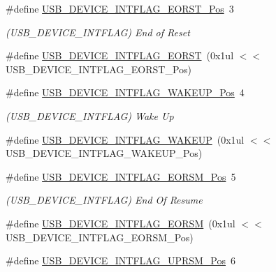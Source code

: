 \begin{DoxyCompactItemize}
\item 
\#define \mbox{\hyperlink{group___s_a_m_d21___u_s_b_ga614893cb9dc255b2b4eef60e35631b44}{U\+S\+B\+\_\+\+D\+E\+V\+I\+C\+E\+\_\+\+I\+N\+T\+F\+L\+A\+G\+\_\+\+E\+O\+R\+S\+T\+\_\+\+Pos}}~3
\begin{DoxyCompactList}\small\item\em (U\+S\+B\+\_\+\+D\+E\+V\+I\+C\+E\+\_\+\+I\+N\+T\+F\+L\+AG) End of Reset \end{DoxyCompactList}\item 
\#define \mbox{\hyperlink{group___s_a_m_d21___u_s_b_ga52b56e82234b7942012de0b2862a6246}{U\+S\+B\+\_\+\+D\+E\+V\+I\+C\+E\+\_\+\+I\+N\+T\+F\+L\+A\+G\+\_\+\+E\+O\+R\+ST}}~(0x1ul $<$$<$ U\+S\+B\+\_\+\+D\+E\+V\+I\+C\+E\+\_\+\+I\+N\+T\+F\+L\+A\+G\+\_\+\+E\+O\+R\+S\+T\+\_\+\+Pos)
\item 
\#define \mbox{\hyperlink{group___s_a_m_d21___u_s_b_ga2c68ce7aca5afcc9b55044c60765980c}{U\+S\+B\+\_\+\+D\+E\+V\+I\+C\+E\+\_\+\+I\+N\+T\+F\+L\+A\+G\+\_\+\+W\+A\+K\+E\+U\+P\+\_\+\+Pos}}~4
\begin{DoxyCompactList}\small\item\em (U\+S\+B\+\_\+\+D\+E\+V\+I\+C\+E\+\_\+\+I\+N\+T\+F\+L\+AG) Wake Up \end{DoxyCompactList}\item 
\#define \mbox{\hyperlink{group___s_a_m_d21___u_s_b_gab02c164bacb2384a8696dcac216bbb4f}{U\+S\+B\+\_\+\+D\+E\+V\+I\+C\+E\+\_\+\+I\+N\+T\+F\+L\+A\+G\+\_\+\+W\+A\+K\+E\+UP}}~(0x1ul $<$$<$ U\+S\+B\+\_\+\+D\+E\+V\+I\+C\+E\+\_\+\+I\+N\+T\+F\+L\+A\+G\+\_\+\+W\+A\+K\+E\+U\+P\+\_\+\+Pos)
\item 
\#define \mbox{\hyperlink{group___s_a_m_d21___u_s_b_gad9f17dc8d2b19fb440eb764f91e7b88e}{U\+S\+B\+\_\+\+D\+E\+V\+I\+C\+E\+\_\+\+I\+N\+T\+F\+L\+A\+G\+\_\+\+E\+O\+R\+S\+M\+\_\+\+Pos}}~5
\begin{DoxyCompactList}\small\item\em (U\+S\+B\+\_\+\+D\+E\+V\+I\+C\+E\+\_\+\+I\+N\+T\+F\+L\+AG) End Of Resume \end{DoxyCompactList}\item 
\#define \mbox{\hyperlink{group___s_a_m_d21___u_s_b_ga6a7810bc403594435eae77f134c424e3}{U\+S\+B\+\_\+\+D\+E\+V\+I\+C\+E\+\_\+\+I\+N\+T\+F\+L\+A\+G\+\_\+\+E\+O\+R\+SM}}~(0x1ul $<$$<$ U\+S\+B\+\_\+\+D\+E\+V\+I\+C\+E\+\_\+\+I\+N\+T\+F\+L\+A\+G\+\_\+\+E\+O\+R\+S\+M\+\_\+\+Pos)
\item 
\#define \mbox{\hyperlink{group___s_a_m_d21___u_s_b_gabd5404f0e8add7199c577eee270d61ed}{U\+S\+B\+\_\+\+D\+E\+V\+I\+C\+E\+\_\+\+I\+N\+T\+F\+L\+A\+G\+\_\+\+U\+P\+R\+S\+M\+\_\+\+Pos}}~6
$$
\end{DoxyCompactItemize}
